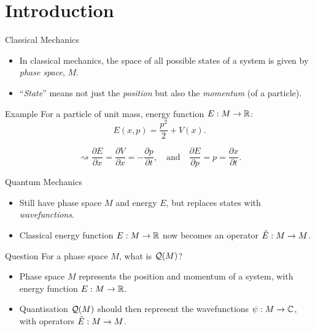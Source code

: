 \section{Introduction}

\begin{frame}{Classical Mechanics}

    \begin{itemize}
        \item In classical mechanics, the space of all possible states of a system is given by \emph{phase space}, $M$.
        \item ``\emph{State}'' means not just the \emph{position} but also the \emph{momentum} (of a particle).
    \end{itemize}
    
    \begin{block}{Example}
        For a particle of unit mass, energy function $E : M \rightarrow \mathbb{R}$:
        \begin{equation*}
            E(x,p) = \frac{p^{2}}{2} + V(x).
        \end{equation*}
    \end{block}

    \begin{equation*}
        \rightsquigarrow \frac{\partial E}{\partial x} = \frac{\partial V}{\partial x} = -\frac{\partial p}{\partial t}, \quad \text{and} \quad \frac{\partial E}{\partial p} = p = \frac{\partial x}{\partial t}.
    \end{equation*}

\end{frame}

\begin{frame}{Quantum Mechanics}

    \begin{itemize}
        \item Still have phase space $M$ and energy $E$, but replaces states with \emph{wavefunctions}.
        \item Classical energy function $E : M \rightarrow \mathbb{R}$ now becomes an operator $\hat{E} : M \rightarrow M$.
    \end{itemize}

    \begin{block}{Question}
        For a phase space $M$, what is $\mathcal{Q}(M)$?

    \begin{itemize}
        \item Phase space $M$ represents the position and momentum of a system, with energy function $E : M \rightarrow \mathbb{R}$.
        \item Quantisation $\mathcal{Q}(M)$ should then represent the wavefunctions $\psi : M \rightarrow \mathbb{C}$, with operators $\hat{E} : M \rightarrow M$.
    \end{itemize}
    \end{block}

\end{frame}